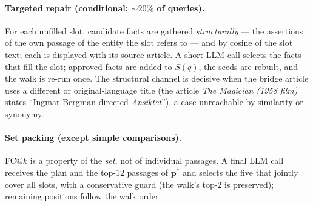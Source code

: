 \documentclass[11pt,a4paper]{article}
\begin{document}
\paragraph{Targeted repair (conditional; ${\sim}20\%$ of queries).} For each
unfilled slot, candidate facts are gathered \emph{structurally} --- the
assertions of the own passage of the entity the slot refers to --- and by
cosine of the slot text; each is displayed with its source article. A short
LLM call selects the facts that fill the slot; approved facts are added to
$S(q)$, the seeds are rebuilt, and the walk is re-run once. The structural
channel is decisive when the bridge article uses a different or
original-language title (the article \emph{The Magician (1958 film)} states
``Ingmar Bergman directed \emph{Ansiktet}''), a case unreachable by
similarity or synonymy.

\paragraph{Set packing (except simple comparisons).} FC@$k$ is a property of
the \emph{set}, not of individual passages. A final LLM call receives the
plan and the top-$12$ passages of $\mathbf p^{*}$ and selects the five that
jointly cover all slots, with a conservative guard (the walk's top-$2$ is
preserved); remaining positions follow the walk order.
\end{document}
